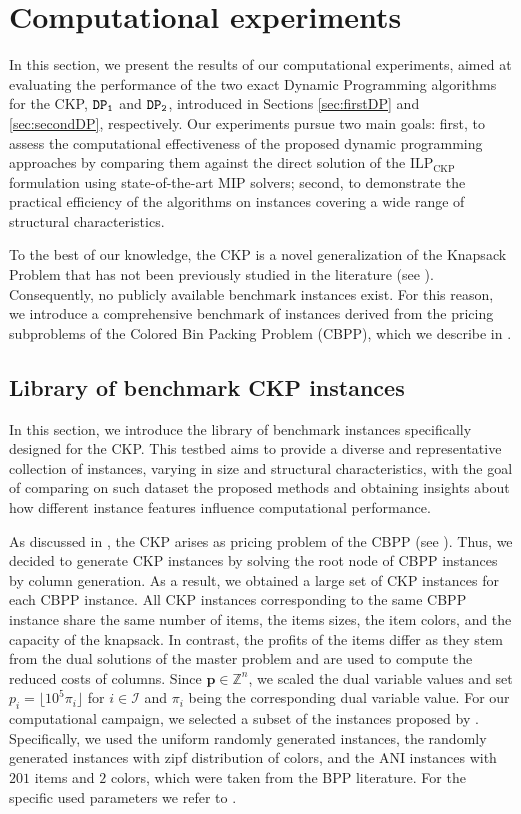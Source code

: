 \documentclass[preprint,11pt]{elsarticle}
\newcommand{\items}{\mathcal{I}}
\newcommand{\profit}{p}
\newcommand{\formCKP}{\text{ILP}_\text{CKP}}
\newcommand{\firstDP}{{\tt DP_1}}
\newcommand{\secondDP}{{\tt DP_2}}
\theoremstyle{definition}
\begin{document}
\section{Computational experiments} 
\label{sec:computationals}

In this section, we present the results of our computational experiments, aimed at evaluating the performance of the two exact Dynamic Programming algorithms for the CKP, $\firstDP$ and $\secondDP$, introduced in Sections \ref{sec:firstDP} and \ref{sec:secondDP}, respectively. 
Our experiments pursue two main goals: first, to assess the computational effectiveness of the proposed dynamic programming approaches by comparing them against the direct solution of the $\formCKP$ formulation using state-of-the-art MIP solvers; second, to demonstrate the practical efficiency of the algorithms on instances covering a wide range of structural characteristics.

To the best of our knowledge, the CKP is a novel generalization of the Knapsack Problem that has not been previously studied in the literature (see ). Consequently, no publicly available benchmark instances exist. For this reason, we introduce a comprehensive benchmark of instances derived from the pricing subproblems of the Colored Bin Packing Problem (CBPP), which we describe in .


\subsection{Library of benchmark CKP instances}
\label{sec:instances}

In this section, we introduce the library of benchmark instances specifically designed for the CKP. This testbed aims to provide a diverse and representative collection of instances, varying in size and structural characteristics, with the goal of comparing on such dataset the proposed methods and obtaining insights about how different instance features influence computational performance.

As discussed in , the CKP arises as pricing problem of the CBPP (see \cite{BorgesSM24}). Thus, we decided to generate CKP instances by solving the root node of CBPP instances by column generation. As a result, we obtained a large set of CKP instances for each CBPP instance. All CKP instances corresponding to the same CBPP instance share the same number of items, the items sizes, the item colors, and the capacity of the knapsack. In contrast, the profits of the items differ as they stem from the dual solutions of the master problem and are used to compute the reduced costs of columns. Since $\boldsymbol \profit \in \mathbb{Z}^n$, we scaled the dual variable values and set $p_i = \lfloor 10^5\pi_i \rfloor$ for $i \in \items$ and $\pi_i$ being the corresponding dual variable value. For our computational campaign, we selected a subset of the instances proposed by \citet{BorgesSM24}. 
Specifically, we used the uniform randomly generated instances, the randomly generated instances with zipf distribution of colors, and the ANI instances with $201$ items and $2$ colors, which were taken from the BPP literature. For the specific used parameters we refer to \citet{BorgesSM24}.
\end{document}
